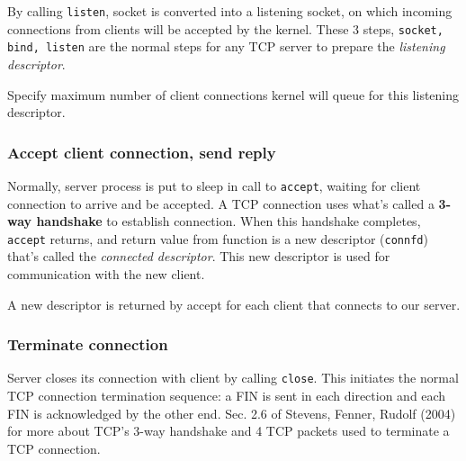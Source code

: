 \documentclass[10pt]{amsart}
\begin{document}
By calling \verb|listen|, socket is converted into a listening socket, on which incoming connections from clients will be accepted by the kernel. These 3 steps, \verb|socket, bind, listen| are the normal steps for any TCP server to prepare the \emph{listening descriptor}.

Specify maximum number of client connections kernel will queue for this listening descriptor.

\subsubsection{Accept client connection, send reply}

Normally, server process is put to sleep in call to \verb|accept|, waiting for client connection to arrive and be accepted. A TCP connection uses what's called a \textbf{3-way handshake} to establish connection. When this handshake completes, \verb|accept| returns, and return value from function is a new descriptor (\verb|connfd|) that's called the \emph{connected descriptor}. This new descriptor is used for communication with the new client.

A new descriptor is returned by accept for each client that connects to our server.

\subsubsection{Terminate connection} 

Server closes its connection with client by calling \verb|close|. This initiates the normal TCP connection termination sequence: a FIN is sent in each direction and each FIN is acknowledged by the other end. Sec. 2.6 of Stevens, Fenner, Rudolf (2004) \cite{SFR2004} for more about TCP's 3-way handshake and 4 TCP packets used to terminate a TCP connection.

\end{document}
